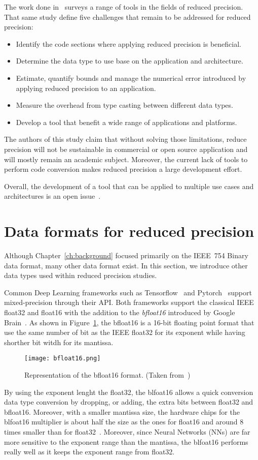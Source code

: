 The work done in~\cite{Cherubin2020-tt} surveys a range of tools in the fields of reduced precision.
That same study define five challenges that remain to be addressed for reduced precision:
\begin{itemize}
	\item[1.] Identify the code sections where applying reduced precision is beneficial.
	\item[2.] Determine the data type to use base on the application and architecture.
	\item[3.] Estimate, quantify bounds and manage the numerical error introduced by applying reduced precision to an application.
	\item[4.] Measure the overhead from type casting between different data types.
	\item[5.] Develop a tool that benefit a wide range of applications and platforms.
\end{itemize}
The authors of this study claim that without solving those limitations, reduce 
precision will not be sustainable in commercial or open source application and 
will mostly remain an academic subject.
Moreover, the current lack of tools to perform code conversion makes reduced precision
a large development effort.

Overall, the development of a tool that can be applied to multiple use cases and
architectures is an open issue~\cite{Cherubin2020-tt}.

\section{Data formats for reduced precision}
\label{sc:rp-data-format}
Although Chapter~\ref{ch:background} focused primarily on the IEEE~754 Binary data format, many other data format exist.
In this section, we introduce other data types used within reduced precision studies.

Common Deep Learning frameworks such as Tensorflow~\cite{tensorflow2015-whitepaper} and Pytorch~\cite{PyTorch_2019} support mixed-precision through their API.
Both frameworks support the classical IEEE float32 and float16 with the addition to the \textit{bfloat16} introduced by Google Brain~\cite{bfloat16}.
As shown in Figure~\ref{fig:bfloat16}, the bfloat16 is a 16-bit floating point format that use
the same number of bit as the IEEE float32 for its exponent while having shorther bit witdh for its mantissa.
\begin{figure}[b]
	\centering
	\texttt{[image: bfloat16.png]}
	\caption{Representation of the bfloat16 format. (Taken from~\cite{bfloat16})}
	\label{fig:bfloat16}
\end{figure}
By using the exponent lenght the float32, the blfoat16 allows a quick conversion
data type conversion by dropping, or adding, the extra bits between float32 and bfloat16.
Moreover, with a smaller mantissa size, the hardware chips for the blfoat16 multiplier
is about half the size as the ones for float16 and around 8 times smaller than for float32~\cite{bfloat16}.
Moreover, since Neural Networks (NNs) are far more sensitive to the exponent range than the mantissa,
the blfoat16 performs really well as it keeps the exponent range from float32.

